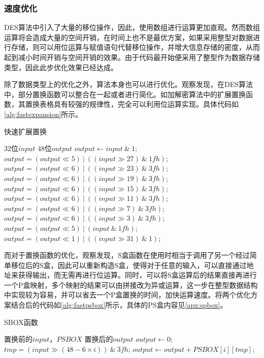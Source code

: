 \documentclass[a4paper, zihao=-4, UTF-8]{ctexart}
\newcommand{\upcite}[1]{{\textsuperscript{\cite{#1}}}}
\begin{document}
            	\subsubsection{速度优化} DES算法中引入了大量的移位操作，因此，使用数组进行运算更加直观。然而数组运算将会造成大量的空间开销，在时间上也不是最优方案，如果采用整型对数据进行存储，则可以用位运算与赋值语句代替移位操作，并增大信息存储的密度，从而起到减小时间开销与空间开销的效果\upcite{1}。由于代码最开始便采用了整型作为数据存储类型，因此此步优化效果已经达成。
            	\par 除了数据类型上的优化之外，算法本身也可以进行优化。观察发现，在DES算法中，部分置换函数可以整合在一起或者进行简化。如加解密算法中的扩展置换函数，其置换表格具有较强的规律性，完全可以利用位运算实现\upcite{1}。具体代码如\cref{alg:fastexpansion}所示。
				\begin{algorithm}[htbp]
            		\caption{快速扩展置换}
            		\label{alg:fastexpansion}
            		\begin{algorithmic}[1]
            			\Require 32位$input$
            			\Ensure 48位$output$
            			\State $output\gets input\ \&\ 1$;
            			\State $output = (output \ll 5)\ |\ ((input \gg 27)\ \&\ 1fh)$;
            			\State $output = (output \ll 6)\ |\ ((input \gg 23)\ \&\ 3fh)$;
            			\State $output = (output \ll 6)\ |\ ((input \gg 19)\ \&\ 3fh)$;
            			\State $output = (output \ll 6)\ |\ ((input \gg 15)\ \&\ 3fh)$;
            			\State $output = (output \ll 6)\ |\ ((input \gg 11)\ \&\ 3fh)$;
            			\State $output = (output \ll 6)\ |\ ((input \gg  7)\ \&\ 3fh)$;
            			\State $output = (output \ll 6)\ |\ ((input \gg  3)\ \&\ 3fh)$;
            			\State $output = (output \ll 5)\ |\ (input\ \&\ 1fh)$;
            			\State $output = (output \ll 1)\ |\ ((input \gg 31)\ \&\ 1)$;
            			\State {}
            			\EndFunction
            		\end{algorithmic}
            	\end{algorithm}
				\par 而对于置换函数的优化，观察发现，S盒函数在使用时相当于调用了另一个经过简单移位后的S盒，因此可以重新构造S盒，使得对于任意的输入，可以直接通过地址来获得输出，而无需再进行位运算。同时，可以将S盒运算后的结果直接再进行一个P盒映射，多个映射的结果可以由拼接改为异或运算，这一步在整型数据结构中实现较为容易，并可以省去一个P盒置换的时间，加快运算速度\upcite{1,2}。将两个优化方案结合后的代码如\cref{alg:fastpsbox}所示，具体的PS盒内容见\cref{apx:spbox}。
				\begin{algorithm}[htbp]
					\caption{SBOX函数}
					\label{alg:fastpsbox}
					\begin{algorithmic}[1]
						\Require 置换前的$input$，$PSBOX$
						\Ensure 置换后的$output$
						\State $output \gets 0$;
						\State $tmp = (input\gg (48-6\times i))\ \&\ 3fh$;
						\State $output \gets output + PSBOX[i][tmp]$;
						\EndFor
						\State {}
						\EndFunction
					\end{algorithmic}
				\end{algorithm}
\end{document}
